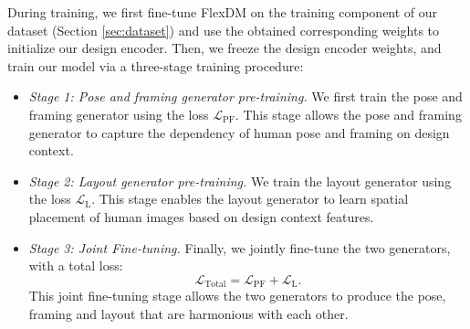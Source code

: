 During training, we first fine-tune FlexDM on the training component of our dataset (Section \ref{sec:dataset}) and use the obtained corresponding weights to initialize our design encoder. 
Then, we freeze the design encoder weights, and train our model via a three-stage training procedure:
\begin{itemize}
    \item \textit{Stage 1: Pose and framing generator pre-training.} We first train 
    the pose and framing generator using the loss $\mathcal{L}_{\text{PF}}$. This stage allows the pose and framing generator to capture the dependency of human pose and framing on design context. 

    \item \textit{Stage 2: Layout generator pre-training.} We train the layout generator using the loss $\mathcal{L}_{\text{L}}$. This stage enables the layout generator to learn spatial placement of human images based on design context features.

    \item \textit{Stage 3: Joint Fine-tuning.} Finally, we jointly fine-tune the two generators, with a total loss:
    \begin{equation}
        \mathcal{L}_{\text{Total}} = \mathcal{L}_{\text{PF}} + \mathcal{L}_{\text{L}}.
    \end{equation}
    This joint fine-tuning stage allows the two generators to produce the pose, framing and layout that are harmonious with each other.
\end{itemize}

